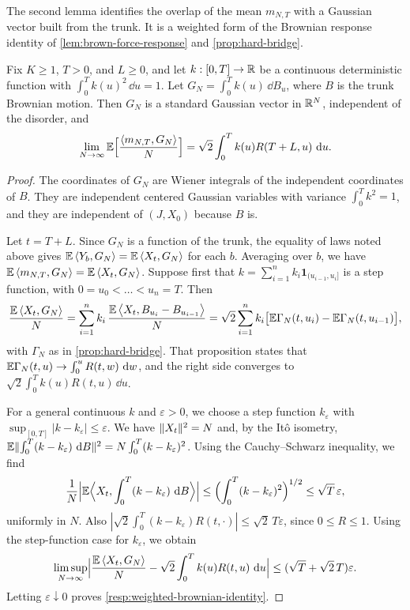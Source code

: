 The second lemma identifies the overlap of the mean $m_{N,T}$ with a Gaussian vector built from the trunk. It is a weighted form of the Brownian response identity of \cref{lem:brown-force-response} and \cref{prop:hard-bridge}.

\begin{lemma}
\label{resp:weighted-brownian}
Fix $K\ge1$, $T>0$, and $L\ge0$, and let $k:[0,T]\to\mathbb R$ be a continuous deterministic function with $\int_0^Tk(u)^2\,\dd u=1$. Let $G_N=\int_0^Tk(u)\,\dd B_u$, where $B$ is the trunk Brownian motion. Then $G_N$ is a standard Gaussian vector in $\mathbb R^N$, independent of the disorder, and
\begin{equation}
 \lim_{N\to\infty}\mathbb E\Bigl[\frac{\left\langle m_{N,T},G_N\right\rangle}N\Bigr]
 =\sqrt2\int_0^Tk(u)R(T+L,u)\,\mathop{}\!\mathrm d u.
 \label{resp:weighted-brownian-identity}
\end{equation}
\end{lemma}

\begin{proof}
The coordinates of $G_N$ are Wiener integrals of the independent coordinates of $B$. They are independent centered Gaussian variables with variance $\int_0^Tk^2=1$, and they are independent of $(J,X_0)$ because $B$ is.

Let $t=T+L$. Since $G_N$ is a function of the trunk, the equality of laws noted above gives $\mathbb E\left\langle Y_b,G_N\right\rangle=\mathbb E\left\langle X_t,G_N\right\rangle$ for each $b$. Averaging over $b$, we have $\mathbb E\left\langle m_{N,T},G_N\right\rangle=\mathbb E\left\langle X_t,G_N\right\rangle$. Suppose first that $k=\sum_{i=1}^nk_i\mathbf1_{(u_{i-1},u_i]}$ is a step function, with $0=u_0<\dots<u_n=T$. Then
\[
 \frac{\mathbb E\left\langle X_t,G_N\right\rangle}N=\sum_{i=1}^nk_i\,\frac{\mathbb E\left\langle X_t,B_{u_i}-B_{u_{i-1}}\right\rangle}N
 =\sqrt2\sum_{i=1}^nk_i\bigl[\mathbb E\Gamma_N(t,u_i)-\mathbb E\Gamma_N(t,u_{i-1})\bigr],
\]
with $\Gamma_N$ as in \cref{prop:hard-bridge}. That proposition states that $\mathbb E\Gamma_N(t,u)\to\int_0^uR(t,w)\,\mathop{}\!\mathrm d w$, and the right side converges to $\sqrt2\int_0^Tk(u)R(t,u)\,\dd u$.

For a general continuous $k$ and $\varepsilon>0$, we choose a step function $k_\varepsilon$ with $\sup_{[0,T]}|k-k_\varepsilon|\le\varepsilon$. We have $\lVert X_t\rVert^2=N$ and, by the Itô isometry, $\mathbb E\lVert\int_0^T(k-k_\varepsilon)\,\mathop{}\!\mathrm d B\rVert^2=N\int_0^T(k-k_\varepsilon)^2$. Using the Cauchy--Schwarz inequality, we find
\[
 \frac1N\Bigl|\mathbb E\Bigl\langle X_t,\int_0^T(k-k_\varepsilon)\,\mathop{}\!\mathrm d B\Bigr\rangle\Bigr|
 \le\Bigl(\int_0^T(k-k_\varepsilon)^2\Bigr)^{1/2}\le\sqrt T\,\varepsilon,
\]
uniformly in $N$. Also $|\sqrt2\int_0^T(k-k_\varepsilon)R(t,\cdot)|\le\sqrt2\,T\varepsilon$, since $0\le R\le1$. Using the step-function case for $k_\varepsilon$, we obtain
\[
 \limsup_{N\to\infty}\Bigl|\frac{\mathbb E\left\langle X_t,G_N\right\rangle}N-\sqrt2\int_0^Tk(u)R(t,u)\,\mathop{}\!\mathrm d u\Bigr|\le(\sqrt T+\sqrt2\,T)\varepsilon.
\]
Letting $\varepsilon\downarrow0$ proves \eqref{resp:weighted-brownian-identity}.
\end{proof}

